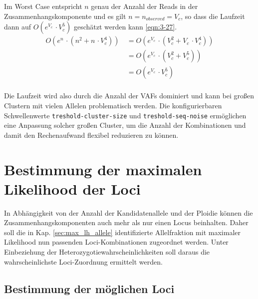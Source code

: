 Im Worst Case entspricht $ n $ genau der Anzahl der Reads in der Zusammenhangskomponente und es gilt $ n = n_{observed} = V_{c} $, so dass die Laufzeit dann auf $ O(e^{V_{c}} \, \cdotp V_{c}^5) $ geschätzt werden kann \eqref{eqn:3-27}.
\begin{equation} \label{eqn:3-27}
\tag{3-27}
\begin{aligned}
O(e^n \, \cdotp (n^2 + n \, \cdotp V_{c}^4))
&\ {} = O(e^{V_{c}} \, \cdotp (V_{c}^2 + V_{c} \, \cdotp V_{c}^4))\\
&\ = O(e^{V_{c}} \, \cdotp (V_{c}^2 + V_{c}^5))\\
&\ = O(e^{V_{c}} \, \cdotp V_{c}^5) \\
\end{aligned}
\end{equation}

Die Laufzeit wird also durch die Anzahl der VAFs dominiert und kann bei großen Clustern mit vielen Allelen problematisch werden. Die konfigurierbaren Schwellenwerte \lstinline|treshold-cluster-size| und \lstinline|treshold-seq-noise| ermöglichen eine Anpassung solcher großen Cluster, um die Anzahl der Kombinationen und damit den Rechenaufwand flexibel reduzieren zu können.

\section{Bestimmung der maximalen Likelihood der Loci} \label{sec:max_lh_loci}

In Abhängigkeit von der Anzahl der Kandidatenallele und der Ploidie können die Zusammenhangskomponenten auch mehr als nur einen Locus beinhalten. Daher soll die in Kap. \ref{sec:max_lh_allele} identifizierte Allelfraktion mit maximaler Likelihood nun passenden Loci-Kombinationen zugeordnet werden. Unter Einbeziehung der Heterozygotiewahrscheinlichkeiten soll daraus die wahrscheinlichste Loci-Zuordnung ermittelt werden.

\subsection{Bestimmung der möglichen Loci} \label{subsec:comb_loci}

